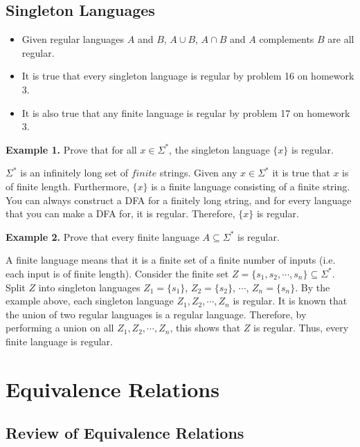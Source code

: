 \documentclass[11pt]{article}
\begin{document}
\subsection{Singleton Languages}

\begin{itemize}
\item Given regular languages $A$ and $B$, $A\cup B$, $A\cap B$ and $A$ complements $B$ are all regular. 
\item It is true that every singleton language is regular by problem 16 on homework 3.
\item It is also true that any finite language is regular by problem 17 on homework 3. 
\end{itemize}

{\bf Example 1.} Prove that for all $x\in\Sigma^*$, the singleton language $\{x\}$ is regular.

$\Sigma^*$ is an infinitely long set of $\textit{finite}$ strings. Given any $x\in\Sigma^*$ it is true that $x$ is of finite length. Furthermore, $\{x\}$ is a finite language consisting of a finite string. You can always construct a DFA for a finitely long string, and for every language that you can make a DFA for, it is regular. Therefore, $\{x\}$ is regular. 

{\bf Example 2.} Prove that every finite language $A\subseteq\Sigma^*$ is regular.

A finite language means that it is a finite set of a finite number of inputs (i.e. each input is of finite length). Consider the finite set $Z=\{s_1,s_2,\cdots,s_n\}\subseteq\Sigma^*$. Split $Z$ into singleton languages $Z_1 = \{s_1\}$, $Z_2 = \{s_2\}$, $\cdots$, $Z_n = \{s_n\}$. By the example above, each singleton language $Z_1,Z_2,\cdots,Z_n$ is regular. It is known that the union of two regular languages is a regular language. Therefore, by performing a union on all $Z_1,Z_2,\cdots,Z_n$, this shows that $Z$ is regular. Thus, every finite language is regular. \\

\section{Equivalence Relations}

\subsection{Review of Equivalence Relations}
\end{document}

